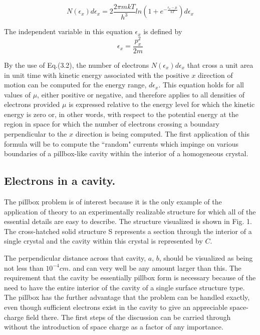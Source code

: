 \documentclass[11pt,a4paper]{article}
\begin{document}
	\begin{equation}
		N(\epsilon_x)d\epsilon_x = 2 \frac{2 \pi m k T}{h^3} ln(1+e^{-\frac{\epsilon_x- \mu}{k T}}) d\epsilon_x
	\end{equation}
	
	The independent variable in this equation $\epsilon_x$ is defined by
	\begin{equation}
		\epsilon_x = \frac{p_x^2}{2m}
	\end{equation}
	
	By the use of Eq.(3.2), the number of electrons $N(\epsilon_x)d\epsilon_x$ that cross a unit area in unit time with kinetic energy associated with the positive $x$ direction of motion can be computed for the energy range, $d\epsilon_x$. This equation holds for all values of $\mu$, either positive or negative, and therefore applies to all densities of electrons provided $\mu$ is expressed relative to the energy level for which the kinetic energy is zero or, in other words, with respect to the potential energy at the region in space for which the number of electrons crossing a boundary perpendicular to the $x$ direction is being computed. The first application of this formula will be to compute the ``random" currents which impinge on various boundaries of a pillbox-like cavity within the interior of a homogeneous crystal.
	
	\subsection{Electrons in a cavity.}
	
	The pillbox problem is of interest because it is the
	only example of the application of theory to an experimentally realizable structure
	for which all of the essential details are easy to describe. The structure visualized
	is shown in Fig. 1. The cross-hatched solid structure S represents a section
	through the interior of a single crystal and the cavity within this crystal is represented by $C$.
	
	The perpendicular distance across that cavity, $a$, $ b$, should be visualized as
	being not less than $10^{-4} cm $. and can very well be any amount larger than this.
	The requirement that the cavity be essentially pillbox form is necessary because
	of the need to have the entire interior of the cavity of a single surface structure
	type. The pillbox has the further advantage that the problem can be handled
	exactly, even though sufficient electrons exist in the cavity to give an appreciable space-charge field there. The first steps of the discussion can be carried
	through without the introduction of space charge as a factor of any importance.
	
\end{document}
